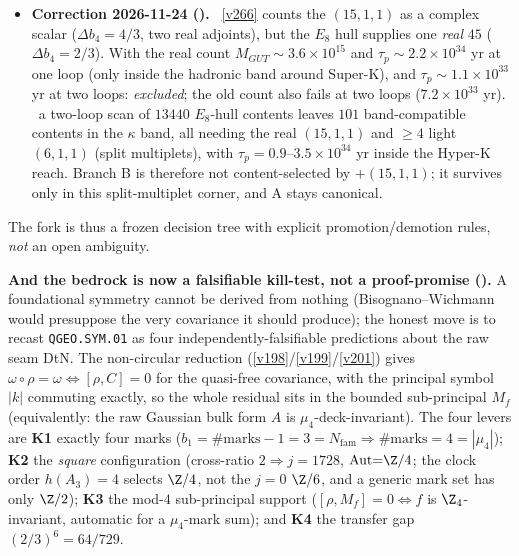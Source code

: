 \begin{keybox}
\begin{itemize}
  in the hull, so it stays structurally marginal; $\tau_p$ carries an $O(3)$ hadronic band).
\item \textbf{Correction 2026-11-24 ().} \mX\ \vref{v266} counts the
  $(15,1,1)$ as a complex scalar ($\Delta b_4{=}4/3$, two real adjoints), but the $E_8$ hull supplies one
  \emph{real} $45$ ($\Delta b_4{=}2/3$). With the real count $M_{GUT}{\sim}3.6{\times}10^{15}$ and
  $\tau_p{\sim}2.2{\times}10^{34}$ yr at one loop (only inside the hadronic band around Super-K), and
  $\tau_p{\sim}1.1{\times}10^{33}$ yr at two loops: \emph{excluded}; the old count also fails at two loops
  ($7.2{\times}10^{33}$ yr). \mN\ a two-loop scan of $13440$ $E_8$-hull contents leaves $101$ band-compatible
  contents in the $\kappa$ band, all needing the real $(15,1,1)$ and ${\ge}4$ light $(6,1,1)$ (split
  multiplets), with $\tau_p{=}0.9$--$3.5{\times}10^{34}$ yr inside the Hyper-K reach. Branch B is therefore
  not content-selected by $+(15,1,1)$; it survives only in this split-multiplet corner, and A stays canonical.
\end{itemize}
The fork is thus a frozen decision tree with explicit promotion/demotion rules, \emph{not} an open ambiguity.
\end{keybox}
\par\smallskip\noindent\textbf{And the bedrock is now a falsifiable kill-test, not a proof-promise
().} A foundational symmetry cannot be derived from nothing
(Bisognano--Wichmann would presuppose the very covariance it should produce); the honest move is to recast
\texttt{QGEO.SYM.01} as four independently-falsifiable predictions about the raw seam DtN. The non-circular
reduction (\vref{v198}/\vref{v199}/\vref{v201}) gives $\omega{\circ}\rho{=}\omega\Leftrightarrow[\rho,C]{=}0$
for the quasi-free covariance, with the principal symbol $|k|$ commuting exactly, so the whole residual sits
in the bounded sub-principal $M_f$ (equivalently: the raw Gaussian bulk form $A$ is $\mu_4$-deck-invariant).
The four levers are \textbf{K1} exactly four marks ($b_1{=}\#\text{marks}{-}1{=}3{=}N_{\mathrm{fam}}\Rightarrow
\#\text{marks}{=}4{=}|\mu_4|$); \textbf{K2} the \emph{square} configuration (cross-ratio $2\Rightarrow
j{=}1728$, $\mathrm{Aut}{=}\Z/4$; the clock order $h(A_3){=}4$ selects $\Z/4$, not the $j{=}0$ $\Z/6$, and a
generic mark set has only $\Z/2$); \textbf{K3} the mod-$4$ sub-principal support ($[\rho,M_f]{=}0\Leftrightarrow
f$ is $\Z_4$-invariant, automatic for a $\mu_4$-mark sum); and \textbf{K4} the transfer gap $(2/3)^6{=}64/729$.
